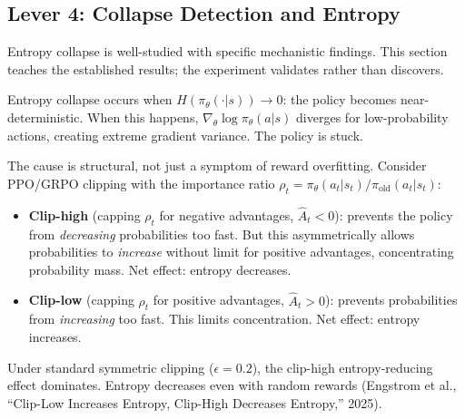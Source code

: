 \subsection*{Lever 4: Collapse Detection and Entropy}

Entropy collapse is well-studied with specific mechanistic findings. This section teaches the established results; the experiment validates rather than discovers.

\begin{thinkfirst}
Entropy collapse occurs when $H(\pi_\theta(\cdot|s)) \to 0$: the policy becomes near-deterministic. When this happens, $\nabla_\theta \log \pi_\theta(a|s)$ diverges for low-probability actions, creating extreme gradient variance. The policy is stuck.

The cause is structural, not just a symptom of reward overfitting. Consider PPO/GRPO clipping with the importance ratio $\rho_t = \pi_\theta(a_t|s_t) / \pi_{\mathrm{old}}(a_t|s_t)$:

\begin{itemize}
  \item \textbf{Clip-high} (capping $\rho_t$ for negative advantages, $\hat{A}_t < 0$): prevents the policy from \textit{decreasing} probabilities too fast. But this asymmetrically allows probabilities to \textit{increase} without limit for positive advantages, concentrating probability mass. Net effect: entropy decreases.
  \item \textbf{Clip-low} (capping $\rho_t$ for positive advantages, $\hat{A}_t > 0$): prevents probabilities from \textit{increasing} too fast. This limits concentration. Net effect: entropy increases.
\end{itemize}

Under standard symmetric clipping ($\epsilon = 0.2$), the clip-high entropy-reducing effect dominates. Entropy decreases even with random rewards (Engstrom et al., ``Clip-Low Increases Entropy, Clip-High Decreases Entropy,'' 2025).

\begin{center}
\end{center}
\end{thinkfirst}
